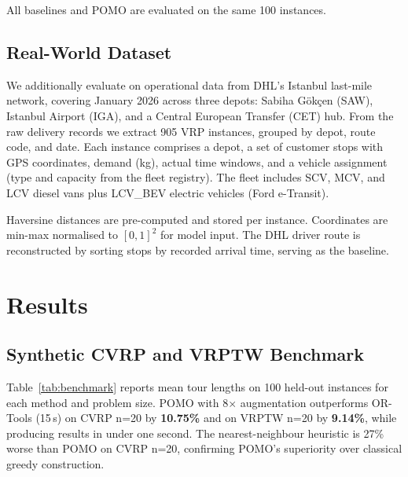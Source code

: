 \documentclass[conference]{IEEEtran}
\begin{document}
All baselines and POMO are evaluated on the same 100 instances.

\subsection{Real-World Dataset}

We additionally evaluate on operational data from DHL's Istanbul
last-mile network, covering January 2026 across three depots: Sabiha
Gök\c{c}en (SAW), Istanbul Airport (IGA), and a Central European Transfer
(CET) hub. From the raw delivery records we extract 905 VRP instances,
grouped by depot, route code, and date. Each instance comprises a depot, a
set of customer stops with GPS coordinates, demand (kg), actual time
windows, and a vehicle assignment (type and capacity from the fleet
registry). The fleet includes SCV, MCV, and LCV diesel vans plus LCV\_BEV
electric vehicles (Ford e-Transit).

Haversine distances are pre-computed and stored per instance. Coordinates
are min-max normalised to $[0,1]^2$ for model input. The DHL driver route
is reconstructed by sorting stops by recorded arrival time, serving as the
baseline.

\section{Results}

\subsection{Synthetic CVRP and VRPTW Benchmark}

Table~\ref{tab:benchmark} reports mean tour lengths on 100 held-out instances
for each method and problem size. POMO with 8$\times$ augmentation
outperforms OR-Tools (15\,s) on CVRP n=20 by \textbf{10.75\%} and on VRPTW
n=20 by \textbf{9.14\%}, while producing results in under one second.
The nearest-neighbour heuristic is 27\% worse than POMO on CVRP n=20,
confirming POMO's superiority over classical greedy construction.
\end{document}
